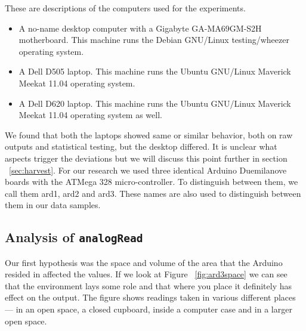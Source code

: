\documentclass[a4paper]{article}           %
\begin{document}
These are descriptions of the computers used for the experiments. 


\begin{itemize}
\item A no-name desktop computer with a Gigabyte GA-MA69GM-S2H motherboard. This machine runs the Debian GNU/Linux testing/wheezer operating system.
\item A Dell D505 laptop. This machine runs the Ubuntu GNU/Linux Maverick Meekat 11.04 operating system.
\item A Dell D620 laptop. This machine runs the Ubuntu GNU/Linux Maverick Meekat 11.04 operating system as well.
\end{itemize}

We found that both the laptops showed same or similar behavior, both on raw outputs and statistical testing, but the desktop differed. It is unclear what aspects trigger the deviations but we will discuss this point further in section ~\ref{sec:harvest}. For our research we used three identical Arduino Duemilanove boards with the ATMega 328 micro-controller. To distinguish between them, we call them ard1, ard2 and ard3. These names are also used to distinguish between them in our data samples. 

\subsection{Analysis of \texttt{analogRead}}


Our first hypothesis was the space and volume of the area that the Arduino resided in affected the values. If we look at Figure ~\ref{fig:ard3space} we can see that the environment lays some role and that where you place it definitely has effect on the output. The figure shows readings taken in various different places --- in an open space, a closed cupboard, inside a computer case and in a larger open space. 
\end{document}

